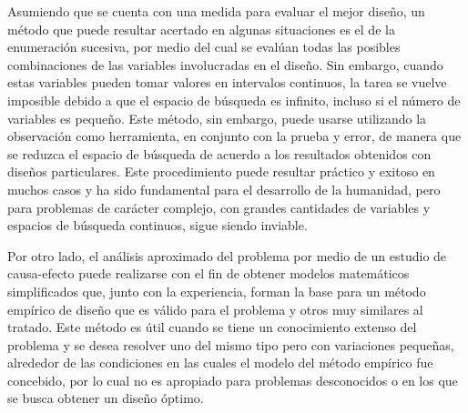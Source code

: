 Asumiendo que se cuenta con una medida para evaluar el mejor diseño, un método que puede resultar acertado en algunas situaciones es el de la enumeración sucesiva, por medio del cual se evalúan todas las posibles combinaciones de las variables involucradas en el diseño. Sin embargo, cuando estas variables pueden tomar valores en intervalos continuos, la tarea se vuelve imposible debido a que el espacio de búsqueda es infinito, incluso si el número de variables es pequeño. Este método, sin embargo, puede usarse utilizando la observación como herramienta, en conjunto con la prueba y error, de manera que se reduzca el espacio de búsqueda de acuerdo a los resultados obtenidos con diseños particulares. Este procedimiento puede resultar práctico y exitoso en muchos casos y ha sido fundamental para el desarrollo de la humanidad, pero para problemas de carácter complejo, con grandes cantidades de variables y espacios de búsqueda continuos, sigue siendo inviable.

Por otro lado, el análisis aproximado del problema por medio de un estudio de causa-efecto puede realizarse con el fin de obtener modelos matemáticos simplificados que, junto con la experiencia, forman la base para un método empírico de diseño que es válido para el problema y otros muy similares al tratado. Este método es útil cuando se tiene un conocimiento extenso del problema y se desea resolver uno del mismo tipo pero con variaciones pequeñas, alrededor de las condiciones en las cuales el modelo del método empírico fue concebido, por lo cual no es apropiado para problemas desconocidos o en los que se busca obtener un diseño óptimo.

